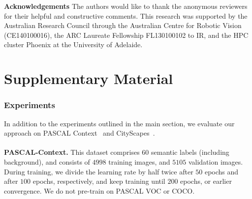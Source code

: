 \documentclass{bmvc2k}
\begin{document}
\noindent
\textbf{Acknowledgements}
The authors would like to thank the anonymous reviewers for their helpful and constructive comments. This research was supported by the Australian Research Council through the Australian Centre for Robotic Vision (CE140100016), the ARC Laureate Fellowship FL130100102 to IR, and the HPC cluster Phoenix at the University of Adelaide.


\newpage

\part*{Supplementary Material}


\vspace{-0.2in}
\section{Experiments}
\label{sec:exps}

In addition to the experiments outlined in the main section, we evaluate our approach on PASCAL Context~\cite{MottaghiCLCLFUY14} and CityScapes~\cite{CordtsORREBFRS16}.\\
\\
\textbf{PASCAL-Context.} This dataset comprises $60$ semantic labels (including background), and consists of $4998$ training images, and $5105$ validation images. During training, we divide the learning rate by half twice after $50$ epochs and after $100$ epochs, respectively, and keep training until $200$ epochs, or earlier convergence. We do not pre-train on PASCAL VOC or COCO.
\end{document}
